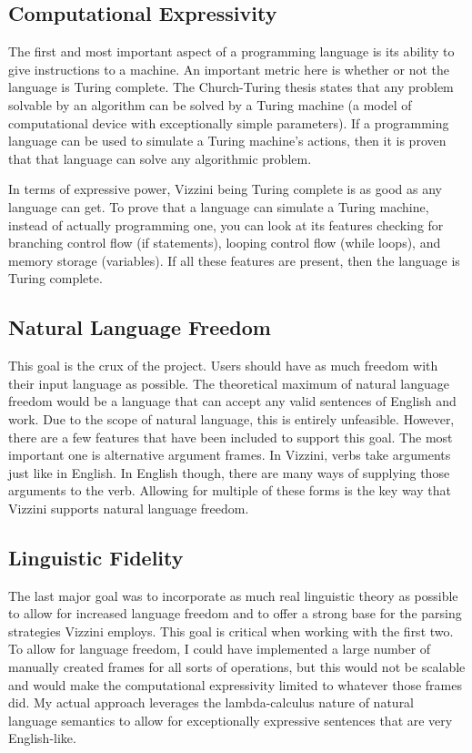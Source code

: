 \documentclass[titlepage]{article}
\newcommand{\langName}{Vizzini}
\begin{document}
\subsection*{Computational Expressivity}
The first and most important aspect of a programming language is its ability to give instructions to a machine. An important metric here is whether or not the language is Turing complete. The Church-Turing thesis states that any problem solvable by an algorithm can be solved by a Turing machine (a model of computational device with exceptionally simple parameters). If a programming language can be used to simulate a Turing machine's actions, then it is proven that that language can solve any algorithmic problem.

In terms of expressive power, \langName{} being Turing complete is as good as any language can get. To prove that a language can simulate a Turing machine, instead of actually programming one, you can look at its features checking for branching control flow (if statements), looping control flow (while loops), and memory storage (variables). If all these features are present, then the language is Turing complete.

\subsection*{Natural Language Freedom}
This goal is the crux of the project. Users should have as much freedom with their input language as possible. The theoretical maximum of natural language freedom would be a language that can accept any valid sentences of English and work. Due to the scope of natural language, this is entirely unfeasible. However, there are a few features that have been included to support this goal. The most important one is alternative argument frames. In \langName{}, verbs take arguments just like in English. In English though, there are many ways of supplying those arguments to the verb. Allowing for multiple of these forms is the key way that \langName{} supports natural language freedom.

\subsection*{Linguistic Fidelity}
The last major goal was to incorporate as much real linguistic theory as possible to allow for increased language freedom and to offer a strong base for the parsing strategies \langName{} employs. This goal is critical when working with the first two. To allow for language freedom, I could have implemented a large number of manually created frames for all sorts of operations, but this would not be scalable and would make the computational expressivity limited to whatever those frames did. My actual approach leverages the lambda-calculus nature of natural language semantics to allow for exceptionally expressive sentences that are very English-like.
\end{document}
